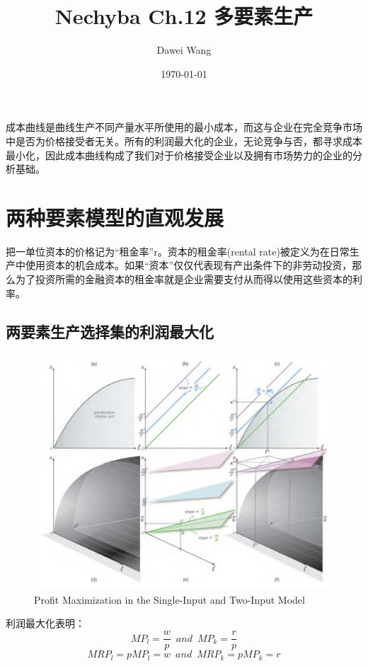 \documentclass{article}
\title{Nechyba Ch.12 多要素生产}
\author{Dawei Wang}
\date{\today}
\begin{document}
	\maketitle
成本曲线是曲线生产不同产量水平所使用的最小成本，而这与企业在完全竞争市场中是否为价格接受者无关。所有的利润最大化的企业，无论竞争与否，都寻求成本最小化，因此成本曲线构成了我们对于价格接受企业以及拥有市场势力的企业的分析基础。

\section{两种要素模型的直观发展}
把一单位资本的价格记为“租金率”r。资本的租金率(rental rate)被定义为在日常生产中使用资本的机会成本。如果“资本”仅仅代表现有产出条件下的非劳动投资，那么为了投资所需的金融资本的租金率就是企业需要支付从而得以使用这些资本的利率。

\subsection{两要素生产选择集的利润最大化}
\begin{figure}[H] %
	\centering %
	\includegraphics[width=1\textwidth]{12_1} %
	\caption{Profit Maximization in the Single-Input and Two-Input Model} %
	\label{Fig.main2} %
\end{figure}

利润最大化表明：
\[
MP_l=\frac{w}{p}\enspace and\enspace MP_k=\frac{r}{p}
\]
\[
MRP_l=pMP_l=w\enspace and\enspace MRP_k=pMP_k=r
\]
\end{document}
